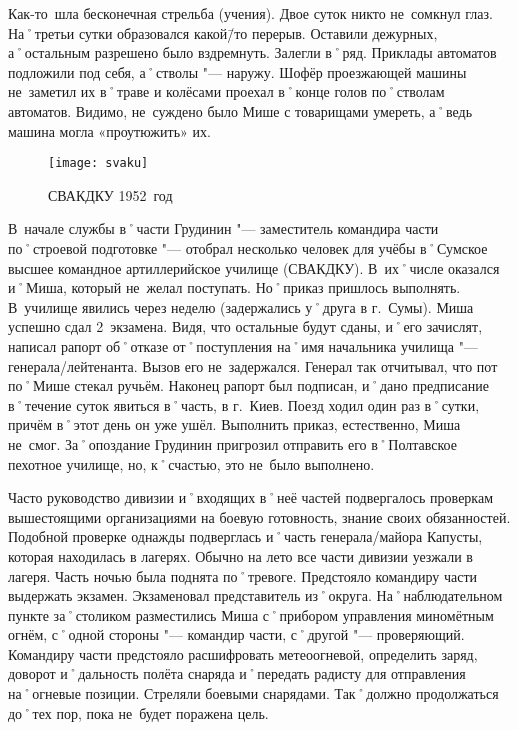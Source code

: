 Как-то~шла бесконечная стрельба (учения). Двое суток никто не~сомкнул глаз. На˚третьи сутки образовался какой\=/то перерыв. Оставили дежурных, а˚остальным разрешено было вздремнуть. Залегли в˚ряд. Приклады автоматов подложили под себя, а˚стволы "---  наружу. Шофёр проезжающей машины не~заметил их в˚траве и колёсами проехал в˚конце голов по˚стволам автоматов. Видимо, не~суждено было Мише с товарищами умереть, а˚ведь машина могла «проутюжить» их.

\begin{wrapfigure}{O}{.4\textwidth}
\centering
\texttt{[image: svaku]}
\caption[СВАКДКУ 1952~год]{СВАКДКУ 1952~год\footnotemark}
\label{fig:svaku}
\end{wrapfigure}

В~начале службы в˚части Грудинин "--- заместитель командира части по˚строевой подготовке "--- отобрал несколько человек для учёбы в˚Сумское высшее командное артиллерийское училище (СВАКДКУ). В~их˚числе оказался и˚Миша, который не~желал поступать. Но˚приказ пришлось выполнять. В~училище явились через неделю (задержались у˚друга в г.~Сумы). Миша успешно сдал 2~экзамена. Видя, что остальные будут сданы, и˚его зачислят, написал рапорт об˚отказе от˚поступления на˚имя начальника училища "--- генерала\-/лейтенанта. Вызов его не~задержался. Генерал так отчитывал, что пот по˚Мише стекал ручьём. Наконец рапорт был подписан, и˚дано предписание в˚течение суток явиться в˚часть, в г.~Киев. Поезд ходил один раз в˚сутки, причём в˚этот день он уже ушёл. Выполнить приказ, естественно, Миша не~смог. За˚опоздание Грудинин пригрозил отправить его в˚Полтавское пехотное училище, но, к˚счастью, это не~было выполнено.  

Часто руководство дивизии и˚входящих в˚неё частей подвергалось проверкам вышестоящими организациями на боевую готовность, знание своих обязанностей. Подобной проверке однажды подверглась и˚часть генерала\-/майора Капусты, которая находилась в лагерях. Обычно на лето все части дивизии уезжали в лагеря. Часть ночью была поднята по˚тревоге. Предстояло командиру части выдержать экзамен. Экзаменовал представитель из˚округа. На˚наблюдательном пункте за˚столиком разместились Миша с˚прибором управления миномётным огнём, с˚одной стороны "--- командир части, с˚другой "--- проверяющий. Командиру части предстояло расшифровать метеоогневой, определить заряд, доворот и˚дальность полёта снаряда и˚передать радисту для отправления на˚огневые позиции. Стреляли боевыми снарядами. Так˚должно продолжаться до˚тех пор, пока не~будет поражена цель.

